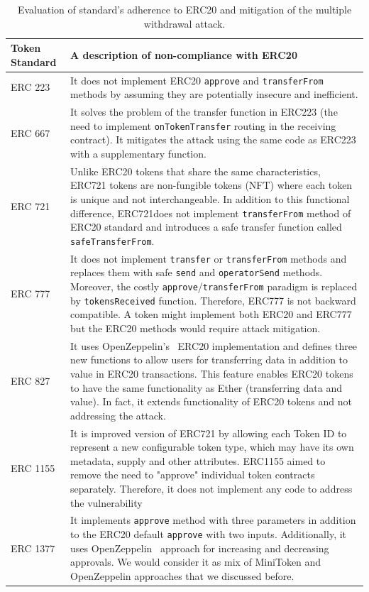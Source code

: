 \begin{table}
\centering
\begin{tabular}{|m{1.3cm}|m{15cm}|}
	\hline\centering
	Token Standard & A description of non-compliance with ERC20\\
	\hline\hline\centering
	ERC 223 \cite{Ref20} & It does not implement ERC20 \texttt{approve} and \texttt{transferFrom} methods by assuming they are potentially insecure and inefficient.\\ 
	\hline\centering 
	ERC 667 \cite{Ref21} & It solves the problem of the transfer function in ERC223 (\ie the need to implement \texttt{onTokenTransfer} routing in the receiving contract). It mitigates the attack using the same code as ERC223 with a supplementary function.\\ 
	\hline\centering 
	ERC 721 \cite{Ref22} & Unlike ERC20 tokens that share the same characteristics, ERC721 tokens are non-fungible tokens (NFT) where each token is unique and not interchangeable. In addition to this functional difference, ERC721does not implement \texttt{transferFrom} method of ERC20 standard and introduces a safe transfer function called \texttt{safeTransferFrom}.\\ 
	\hline\centering
	ERC 777 \cite{Ref23} & It does not implement \texttt{transfer} or \texttt{transferFrom} methods and replaces them with safe \texttt{send} and \texttt{operatorSend} methods. Moreover, the costly \texttt{approve}/\texttt{transferFrom} paradigm is replaced by \texttt{tokensReceived} function. Therefore, ERC777 is not backward compatible. A token might implement both ERC20 and ERC777 but the ERC20 methods would require attack mitigation.\\ 
	\hline\centering 
	ERC 827 \cite{Ref24} & It uses OpenZeppelin's~\cite{Ref10} ERC20 implementation and defines three new functions to allow users for transferring data in addition to value in ERC20 transactions. This feature enables ERC20 tokens to have the same functionality as Ether (transferring data and value). In fact, it extends functionality of ERC20 tokens and not addressing the attack. \\ 
	\hline\centering 
	ERC 1155 \cite{Ref25} & It is improved version of ERC721 by allowing each Token ID to represent a new configurable token type, which may have its own metadata, supply and other attributes. ERC1155 aimed to remove the need to "approve" individual token contracts separately. Therefore, it does not implement any code to address the vulnerability\\ 
	\hline\centering 
	ERC 1377 \cite{Ref26} & It implements \texttt{approve} method with three parameters in addition to the ERC20 default \texttt{approve} with two inputs. Additionally, it uses OpenZeppelin~\cite{Ref10} approach for increasing and decreasing approvals. We would consider it as mix of MiniToken and OpenZeppelin approaches that we discussed before.\\
	\hline
\end{tabular}
\newline
\caption{Evaluation of standard's adherence to ERC20 and mitigation of the multiple withdrawal attack.\label{tab:erc}}
\end{table}

